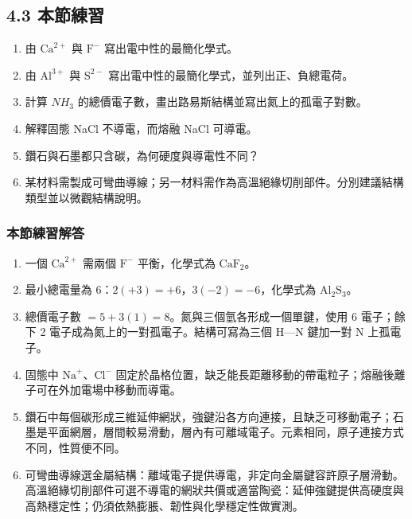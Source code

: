 \documentclass[11pt,a4paper]{article}
\providecommand{\tightlist}{%
  \setlength{\itemsep}{0pt}\setlength{\parskip}{0pt}}
\begin{document}
\subsection{4.3 本節練習}\label{ux672cux7bc0ux7df4ux7fd2-3}

\begin{enumerate}
\def\labelenumi{\arabic{enumi}.}
\tightlist
\item
  由 \(\mathrm{Ca}^{2+}\) 與 \(\mathrm F^-\) 寫出電中性的最簡化學式。
\item
  由 \(\mathrm{Al}^{3+}\) 與 \(\mathrm S^{2-}\) 寫出電中性的最簡化學式，並列出正、負總電荷。
\item
  計算 \(NH_3\) 的總價電子數，畫出路易斯結構並寫出氮上的孤電子對數。
\item
  解釋固態 NaCl 不導電，而熔融 NaCl 可導電。
\item
  鑽石與石墨都只含碳，為何硬度與導電性不同？
\item
  某材料需製成可彎曲導線；另一材料需作為高溫絕緣切削部件。分別建議結構類型並以微觀結構說明。
\end{enumerate}

\subsubsection{本節練習解答}\label{ux672cux7bc0ux7df4ux7fd2ux89e3ux7b54-3}

\begin{enumerate}
\def\labelenumi{\arabic{enumi}.}
\tightlist
\item
  一個 \(\mathrm{Ca}^{2+}\) 需兩個 \(\mathrm F^-\) 平衡，化學式為 \(\mathrm{CaF_2}\)。
\item
  最小總電量為 6：\(2(+3)=+6\)，\(3(-2)=-6\)，化學式為 \(\mathrm{Al_2S_3}\)。
\item
  總價電子數 \(=5+3(1)=8\)。氮與三個氫各形成一個單鍵，使用 6 電子；餘下 2 電子成為氮上的一對孤電子。結構可寫為三個 H---N 鍵加一對 N 上孤電子。
\item
  固態中 \(\mathrm{Na}^+\)、\(\mathrm{Cl}^-\) 固定於晶格位置，缺乏能長距離移動的帶電粒子；熔融後離子可在外加電場中移動而導電。
\item
  鑽石中每個碳形成三維延伸網狀，強鍵沿各方向連接，且缺乏可移動電子；石墨是平面網層，層間較易滑動，層內有可離域電子。元素相同，原子連接方式不同，性質便不同。
\item
  可彎曲導線選金屬結構：離域電子提供導電，非定向金屬鍵容許原子層滑動。高溫絕緣切削部件可選不導電的網狀共價或適當陶瓷：延伸強鍵提供高硬度與高熱穩定性；仍須依熱膨脹、韌性與化學穩定性做實測。
\end{enumerate}
\end{document}
